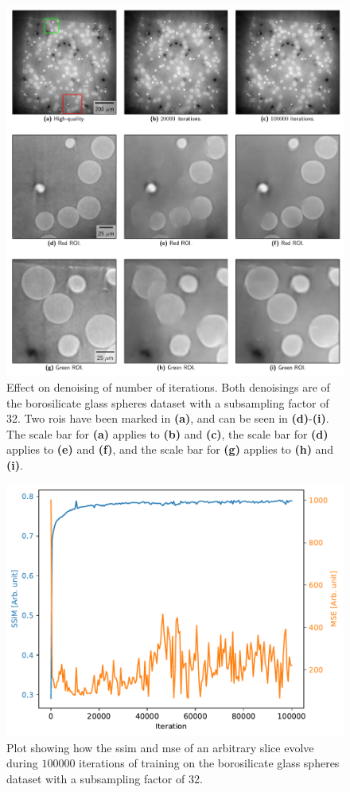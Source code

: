 \begin{figure}[htbp]
  \centering
  \includegraphics[width=.85\textwidth]{figures/iterationdenoisingcomparison.pdf}
  \caption[Effect on denoising of number of iterations]{Effect on denoising of number of iterations. Both denoisings are of the borosilicate glass spheres dataset with a subsampling factor of 32. Two \gls{roi}s have been marked in \textbf{(a)}, and can be seen in \textbf{(d)}-\textbf{(i)}. The scale bar for \textbf{(a)} applies to \textbf{(b)} and \textbf{(c)}, the scale bar for \textbf{(d)} applies to \textbf{(e)} and \textbf{(f)}, and the scale bar for \textbf{(g)} applies to \textbf{(h)} and \textbf{(i)}. }
  \label{fig:iterationdenoisingcomparison}
\end{figure}

\begin{figure}[htbp]
  \centering
  \includegraphics[width=.85\textwidth]{figures/ssimns32logcosh.pdf}
  \caption[SSIM and MSE evolution during training]{Plot showing how the \gls{ssim} and \gls{mse} of an arbitrary slice evolve during $100000$ iterations of training on the borosilicate glass spheres dataset with a subsampling factor of 32. }
  \label{fig:ssimmseevolution}
\end{figure}

